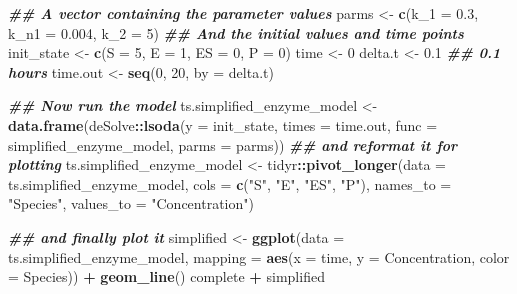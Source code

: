 \documentclass[
]{article}
\newenvironment{Shaded}{\begin{snugshade}}{\end{snugshade}}
\newcommand{\AttributeTok}[1]{\textcolor[rgb]{0.13,0.29,0.53}{#1}}
\newcommand{\DecValTok}[1]{\textcolor[rgb]{0.00,0.00,0.81}{#1}}
\newcommand{\DocumentationTok}[1]{\textcolor[rgb]{0.56,0.35,0.01}{\textbf{\textit{#1}}}}
\newcommand{\FloatTok}[1]{\textcolor[rgb]{0.00,0.00,0.81}{#1}}
\newcommand{\FunctionTok}[1]{\textcolor[rgb]{0.13,0.29,0.53}{\textbf{#1}}}
\newcommand{\NormalTok}[1]{#1}
\newcommand{\OtherTok}[1]{\textcolor[rgb]{0.56,0.35,0.01}{#1}}
\newcommand{\SpecialCharTok}[1]{\textcolor[rgb]{0.81,0.36,0.00}{\textbf{#1}}}
\newcommand{\StringTok}[1]{\textcolor[rgb]{0.31,0.60,0.02}{#1}}
\begin{document}
\begin{Shaded}
\begin{Highlighting}[]
\DocumentationTok{\#\# A vector containing the parameter values}
\NormalTok{parms }\OtherTok{\textless{}{-}} \FunctionTok{c}\NormalTok{(}\AttributeTok{k\_1 =} \FloatTok{0.3}\NormalTok{, }\AttributeTok{k\_n1 =} \FloatTok{0.004}\NormalTok{, }\AttributeTok{k\_2 =} \DecValTok{5}\NormalTok{)}
\DocumentationTok{\#\# And the initial values and time points}
\NormalTok{init\_state }\OtherTok{\textless{}{-}} \FunctionTok{c}\NormalTok{(}\AttributeTok{S =} \DecValTok{5}\NormalTok{, }\AttributeTok{E =} \DecValTok{1}\NormalTok{, }\AttributeTok{ES =} \DecValTok{0}\NormalTok{, }\AttributeTok{P =} \DecValTok{0}\NormalTok{)}
\NormalTok{time }\OtherTok{\textless{}{-}} \DecValTok{0}
\NormalTok{delta.t }\OtherTok{\textless{}{-}} \FloatTok{0.1}  \DocumentationTok{\#\# 0.1 hours}
\NormalTok{time.out }\OtherTok{\textless{}{-}} \FunctionTok{seq}\NormalTok{(}\DecValTok{0}\NormalTok{, }\DecValTok{20}\NormalTok{, }\AttributeTok{by =}\NormalTok{ delta.t)}

\DocumentationTok{\#\# Now run the model}
\NormalTok{ts.simplified\_enzyme\_model }\OtherTok{\textless{}{-}} \FunctionTok{data.frame}\NormalTok{(deSolve}\SpecialCharTok{::}\FunctionTok{lsoda}\NormalTok{(}\AttributeTok{y =}\NormalTok{ init\_state,}
    \AttributeTok{times =}\NormalTok{ time.out, }\AttributeTok{func =}\NormalTok{ simplified\_enzyme\_model,}
    \AttributeTok{parms =}\NormalTok{ parms))}
\DocumentationTok{\#\# and reformat it for plotting}
\NormalTok{ts.simplified\_enzyme\_model }\OtherTok{\textless{}{-}}\NormalTok{ tidyr}\SpecialCharTok{::}\FunctionTok{pivot\_longer}\NormalTok{(}\AttributeTok{data =}\NormalTok{ ts.simplified\_enzyme\_model,}
    \AttributeTok{cols =} \FunctionTok{c}\NormalTok{(}\StringTok{"S"}\NormalTok{, }\StringTok{"E"}\NormalTok{, }\StringTok{"ES"}\NormalTok{, }\StringTok{"P"}\NormalTok{), }\AttributeTok{names\_to =} \StringTok{"Species"}\NormalTok{,}
    \AttributeTok{values\_to =} \StringTok{"Concentration"}\NormalTok{)}

\DocumentationTok{\#\# and finally plot it}
\NormalTok{simplified }\OtherTok{\textless{}{-}} \FunctionTok{ggplot}\NormalTok{(}\AttributeTok{data =}\NormalTok{ ts.simplified\_enzyme\_model,}
    \AttributeTok{mapping =} \FunctionTok{aes}\NormalTok{(}\AttributeTok{x =}\NormalTok{ time, }\AttributeTok{y =}\NormalTok{ Concentration, }\AttributeTok{color =}\NormalTok{ Species)) }\SpecialCharTok{+}
    \FunctionTok{geom\_line}\NormalTok{()}
\NormalTok{complete }\SpecialCharTok{+}\NormalTok{ simplified}
\end{Highlighting}
\end{Shaded}
\end{document}

